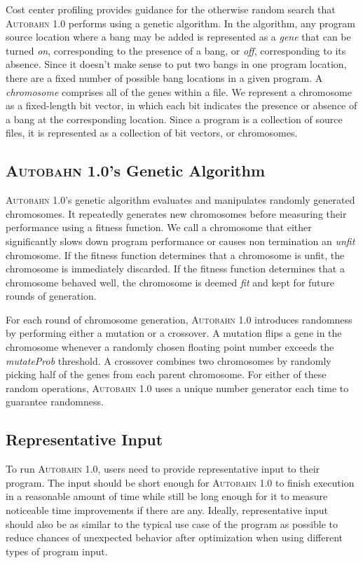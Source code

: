 \documentclass[format=sigplan, review=true]{acmart}
\newcommand{\unfit}[0]{unfit}
\newcommand{\Ao}[0]{\textsc{Autobahn 1.0}}
\newcommand{\fit}[0]{fit}
\begin{document}
Cost center profiling provides guidance for the otherwise random
search that \Ao{} performs using a genetic algorithm. In the
algorithm, any program source location where a bang may be added is
represented as a \textit{gene} that can be turned \textit{on},
corresponding to the presence of a bang, or \textit{off},
corresponding to its absence.  Since it doesn't make sense to put two
bangs in one program location, there are a fixed number of possible
bang locations in a given program. A \textit{chromosome} comprises all
of the genes within a file. We represent a chromosome as a
fixed-length bit vector, in which each bit indicates the presence or
absence of a bang at the corresponding location. Since a program is a
collection of source files, it is represented as a collection of bit
vectors, or chromosomes.

\subsection{\Ao{}'s Genetic Algorithm}

\Ao{}'s genetic algorithm evaluates and manipulates randomly generated chromosomes. It repeatedly generates new chromosomes before measuring their performance using a fitness function. We call a chromosome that either significantly slows down program performance or causes non termination an \textit{\unfit{}} chromosome. If the fitness function determines that a chromosome is \unfit{}, the chromosome is immediately discarded. If the fitness function determines that a chromosome behaved well, the chromosome is deemed \textit{\fit{}} and kept for future rounds of generation. 

For each round of chromosome generation, \Ao{} introduces randomness by performing either a mutation or a crossover. A mutation flips a gene in the chromosome whenever a randomly chosen floating point number exceeds the \textit{mutateProb} threshold. A crossover combines two chromosomes by randomly picking half of the genes from each parent chromosome. For either of these random operations, \Ao{} uses a unique number generator each time to guarantee randomness. 

\subsection{Representative Input}

To run \Ao{}, users need to provide representative input to their program. The input should be short enough for \Ao{} to finish execution in a reasonable amount of time while still be long enough for it to measure noticeable time improvements if there are any. Ideally, representative input should also be as similar to the typical use case of the program as possible to reduce chances of unexpected behavior after optimization when using different types of program input.
\end{document}
